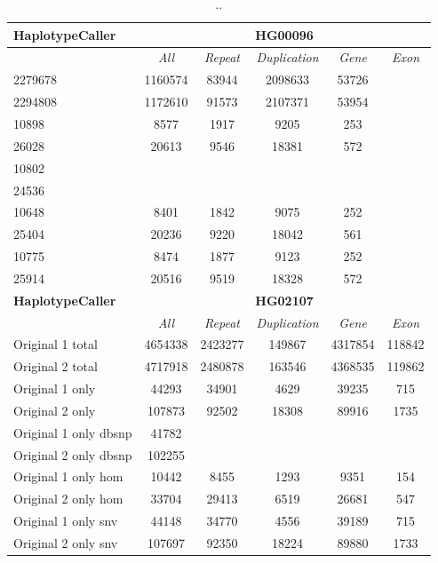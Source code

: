 \begin{table}[htb]
\begin{center}
\begin{tabular}{|l|c||c|c|c|c|}
\hline
{\bf HaplotypeCaller} & \multicolumn{5}{|c|}{\bf HG00096} \\
\hline
\cline{2-6}
{\bf} & {\it All} & {\it Repeat} & {\it Duplication} & {\it Gene} & {\it Exon} \\
\hline
2279678 & 1160574 & 83944 & 2098633 & 53726\\ 
\hline
2294808 & 1172610 & 91573 & 2107371 & 53954\\ 
\hline
10898 & 8577 & 1917 & 9205 & 253\\ 
\hline
26028 & 20613 & 9546 & 18381 & 572\\ 
\hline
10802 &  &  &  & \\ 
\hline
24536 &  &  &  & \\ 
\hline
10648 & 8401 & 1842 & 9075 & 252\\ 
\hline
25404 & 20236 & 9220 & 18042 & 561\\ 
\hline
10775 & 8474 & 1877 & 9123 & 252\\ 
\hline
25914 & 20516 & 9519 & 18328 & 572\\ 
\hline
\hline
{\bf HaplotypeCaller} & \multicolumn{5}{|c|}{\bf HG02107} \\
\hline
\cline{2-6}
{\bf} & {\it All} & {\it Repeat} & {\it Duplication} & {\it Gene} & {\it Exon} \\
\hline
Original 1 total & 4654338 & 2423277 & 149867 & 4317854 & 118842\\ 
\hline
Original 2 total & 4717918 & 2480878 & 163546 & 4368535 & 119862\\ 
\hline
Original 1 only & 44293 & 34901 & 4629 & 39235 & 715\\
\hline 
Original 2 only & 107873 & 92502 & 18308 & 89916 & 1735\\
\hline 
Original 1 only dbsnp & 41782 &  &  &  & \\
\hline 
Original 2 only dbsnp & 102255 &  &  &  & \\
\hline 
Original 1 only hom & 10442 & 8455 & 1293 & 9351 & 154\\
\hline 
Original 2 only hom & 33704 & 29413 & 6519 & 26681 & 547\\
\hline 
Original 1 only snv & 44148 & 34770 & 4556 & 39189 & 715\\
\hline 
Original 2 only snv & 107697 & 92350 & 18224 & 89880 & 1733\\
\hline 
\end{tabular}
\end{center}
\caption{ .. }
\label{tab:orig-vs-shuf-hc}
\end{table}



